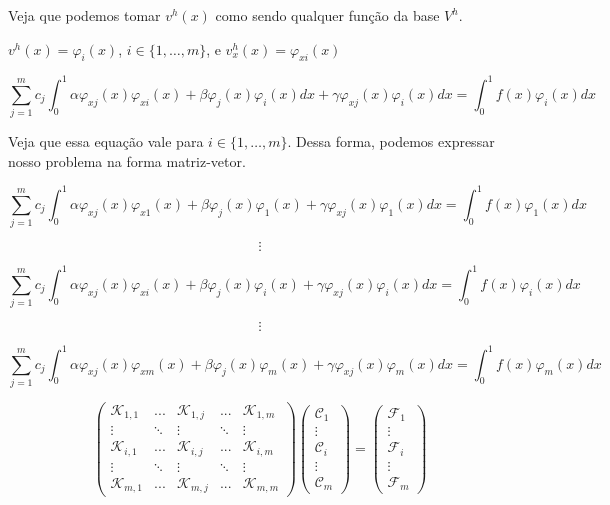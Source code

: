 \begin{frame}
  Veja que podemos tomar $v^h(x)$ como sendo qualquer função da base $V^h$.

  $v^h(x) = \varphi_i(x)$, $i \in \{1,\dots,m\}$, e $v^h_x(x) = \varphi_{xi}(x)$

  \vspace{0.3cm}

  \[\sum_{j=1}^{m} c_j \int_{0}^{1} \alpha \varphi_{xj}(x) \varphi_{xi}(x) + \beta \varphi_j(x) \varphi_i(x)dx + \gamma \varphi_{xj}(x) \varphi_i(x)dx = \int_{0}^{1} f(x) \varphi_i(x)dx\]

  \vspace{0.3cm}

  Veja que essa equação vale para $i \in \{1,\dots,m\}$. Dessa forma, podemos expressar nosso problema na forma matriz-vetor.
\end{frame}

\begin{frame}
  \[\displaystyle\sum_{j=1}^{m} c_j \int_{0}^{1}\alpha \varphi_{xj}(x) \varphi_{x1}(x) + \beta \varphi_j(x) \varphi_1(x) + \gamma \varphi_{xj}(x) \varphi_1(x)dx = \int_{0}^{1} f(x) \varphi_1(x)dx\]

  \[\vdots\]

  \[\displaystyle\sum_{j=1}^{m} c_j \int_{0}^{1} \alpha \varphi_{xj}(x) \varphi_{xi}(x)  + \beta \varphi_j(x) \varphi_i(x) + \gamma \varphi_{xj}(x) \varphi_i(x)dx = \int_{0}^{1} f(x) \varphi_i(x)dx\]

  \[\vdots\]

  \[\displaystyle\sum_{j=1}^{m} c_j \int_{0}^{1} \alpha \varphi_{xj}(x) \varphi_{xm}(x) + \beta \varphi_j(x) \varphi_m(x) + \gamma \varphi_{xj}(x) \varphi_m(x)dx = \int_{0}^{1} f(x) \varphi_m(x)dx\]
\end{frame}

\begin{frame}
\[
\begin{pmatrix}
  \mathcal{K}_{1,1} & ... & \mathcal{K}_{1,j} & ... & \mathcal{K}_{1,m} \\
  \vdots & \ddots & \vdots & \ddots & \vdots \\
  \mathcal{K}_{i,1} & ... & \mathcal{K}_{i,j} & ... & \mathcal{K}_{i,m} \\
  \vdots & \ddots & \vdots & \ddots & \vdots \\
  \mathcal{K}_{m,1} & ... & \mathcal{K}_{m,j} & ... & \mathcal{K}_{m,m}
\end{pmatrix}
\begin{pmatrix}
  \mathcal{C}_1 \\ \vdots \\ \mathcal{C}_i \\ \vdots \\ \mathcal{C}_m
\end{pmatrix}
=
\begin{pmatrix}
  \mathcal{F}_1 \\ \vdots \\ \mathcal{F}_i \\ \vdots \\ \mathcal{F}_m
\end{pmatrix}
\]
\end{frame}

